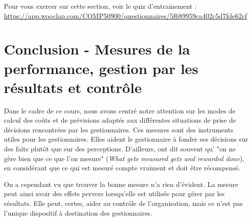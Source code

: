 \documentclass[oneside]{kaobook}
\begin{document}
\begin{kaobox}
Pour vous exercer sur cette section, voir le quiz d'entrainement : \url{https://app.wooclap.com/COMP50900/questionnaires/5f689959ca402c5d7fde62cf}
\end{kaobox}

\chapter{Conclusion - Mesures de la performance, gestion par les résultats et contrôle}
\label{sec:org2f0fc8b}
Dans le cadre de ce cours, nous avons centré notre attention sur les modes de calcul des coûts et de prévisions adaptés aux différentes situations de prise de décisions rencontrées par les gestionnaires. Ces mesures sont des instruments utiles pour les gestionnaires. Elles aident le gestionnaire à fonder ses décisions sur des faits plutôt que sur des perceptions. D'ailleurs, ont dit souvent qu' "on ne gère bien que ce que l'on mesure" (\emph{What gets measured gets and rewarded done}), en considérant que ce qui est mesuré compte vraiment et doit être récompensé. 

On a cependant vu que trouver la bonne mesure n'a rien d’évident. La mesure peut ainsi avoir des effets pervers lorsqu'elle est utilisée pour gérer par les résultats. Elle peut, certes, aider au contrôle de l'organisation, mais ce n'est pas l'unique dispositif à destination des gestionnaires.
\end{document}
